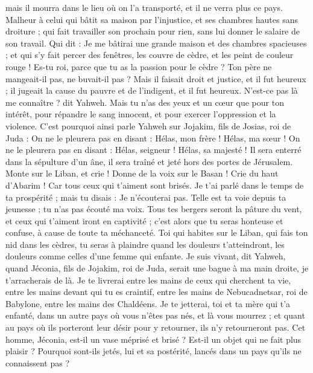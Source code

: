 \begin{multicols}{2}
mais il mourra dans le lieu où on l'a transporté, et il ne verra plus ce pays.
Malheur à celui qui bâtit sa maison par l'injustice, et ses chambres hautes sans droiture ; qui fait travailler son prochain pour rien, sans lui donner le salaire de son travail.
Qui dit : Je me bâtirai une grande maison et des chambres spacieuses ; et qui s'y fait percer des fenêtres, les couvre de cèdre, et les peint de couleur rouge !
Es-tu roi, parce que tu as la passion pour le cèdre ? Ton père ne mangeait-il pas, ne buvait-il pas ? Mais il faisait droit et justice, et il fut heureux ;
il jugeait la cause du pauvre et de l'indigent, et il fut heureux. N'est-ce pas là me connaître ? dit Yahweh.
Mais tu n'as des yeux et un cœur que pour ton intérêt, pour répandre le sang innocent, et pour exercer l'oppression et la violence.
C'est pourquoi ainsi parle Yahweh sur Jojakim, fils de Josias, roi de Juda : On ne le pleurera pas en disant : Hélas, mon frère ! Hélas, ma sœur ! On ne le pleurera pas en disant : Hélas, seigneur ! Hélas, sa majesté !
Il sera enterré dans la sépulture d'un âne, il sera traîné et jeté hors des portes de Jérusalem.
Monte sur le Liban, et crie ! Donne de la voix sur le Basan ! Crie du haut d'Abarim ! Car tous ceux qui t'aiment sont brisés.
Je t'ai parlé dans le temps de ta prospérité ; mais tu disais : Je n'écouterai pas. Telle est ta voie depuis ta jeunesse ; tu n'as pas écouté ma voix.
Tous tes bergers seront la pâture du vent, et ceux qui t'aiment iront en captivité ; c'est alors que tu seras honteuse et confuse, à cause de toute ta méchanceté.
Toi qui habites sur le Liban, qui fais ton nid dans les cèdres, tu seras à plaindre quand les douleurs t'atteindront, les douleurs comme celles d'une femme qui enfante.
Je suis vivant, dit Yahweh, quand Jéconia, fils de Jojakim, roi de Juda, serait une bague à ma main droite, je t'arracherais de là.
Je te livrerai entre les mains de ceux qui cherchent ta vie, entre les mains devant qui tu es craintif, entre les mains de Nebucadnetsar, roi de Babylone, entre les mains des Chaldéens.
Je te jetterai, toi et ta mère qui t'a enfanté, dans un autre pays où vous n'êtes pas nés, et là vous mourrez ;
et quant au pays où ils porteront leur désir pour y retourner, ils n'y retourneront pas.
Cet homme, Jéconia, est-il un vase méprisé et brisé ? Est-il un objet qui ne fait plus plaisir ? Pourquoi sont-ils jetés, lui et sa postérité, lancés dans un pays qu'ils ne connaissent pas ?

\end{multicols}
